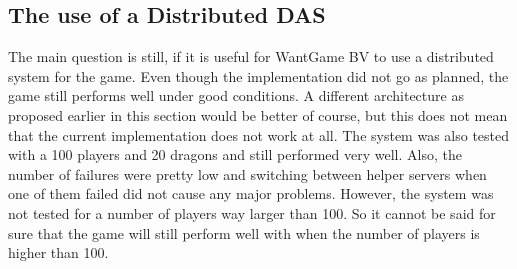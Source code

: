 \subsection{The use of a Distributed DAS}
The main question is still, if it is useful for WantGame BV to use a distributed system for the game.
Even though the implementation did not go as planned, the game still performs well under good conditions.
A different architecture as proposed earlier in this section would be better of course, but this does not mean that the current implementation does not work at all.
The system was also tested with a 100 players and 20 dragons and still performed very well.
Also, the number of failures were pretty low and switching between helper servers when one of them failed did not cause any major problems.
However, the system was not tested for a number of players way larger than 100.
So it cannot be said for sure that the game will still perform well with when the number of players is higher than 100.

